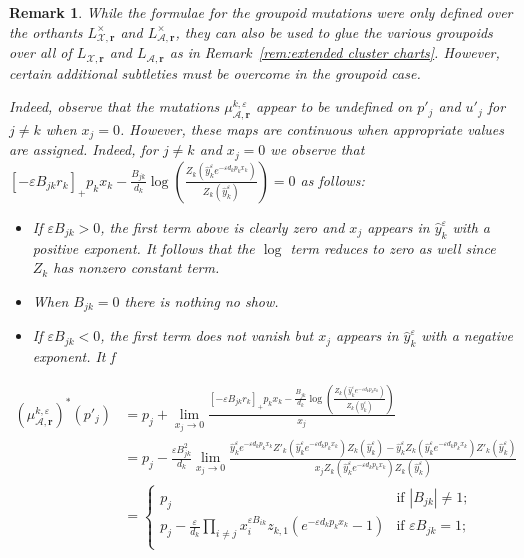 \documentclass{amsart}
\newtheorem{remark}[theorem]{Remark}
\numberwithin{equation}{section}
\newcommand{\bfr}{{\boldsymbol{r}}}
\newcommand{\cA}{\mathcal{A}}
\newcommand{\cX}{\mathcal{X}}
\begin{document}
\begin{remark}
  \label{rem:extended groupoid charts}
  While the formulae for the groupoid mutations were only defined over the orthants $L^\times_{\cX,\bfr}$ and $L^\times_{\cA,\bfr}$, they can also be used to glue the various groupoids over all of $L_{\cX,\bfr}$ and $L_{\cA,\bfr}$ as in Remark~\ref{rem:extended cluster charts}.
  However, certain additional subtleties must be overcome in the groupoid case.
  
  Indeed, observe that the mutations $\mu_{\cA,\bfr}^{k,\varepsilon}$ appear to be undefined on $p'_j$ and $u'_j$ for $j\ne k$ when $x_j=0$.
  However, these maps are continuous when appropriate values are assigned.
  Indeed, for $j\ne k$ and $x_j=0$ we observe that $[-\varepsilon B_{jk} r_k]_+ p_k x_k - \frac{B_{jk}}{d_k}\log\left(\frac{Z_k(\hat y_k^\varepsilon e^{-\varepsilon d_kp_kx_k})}{Z_k(\hat y_k^\varepsilon)}\right)=0$ as follows:
  \begin{itemize}
    \item If $\varepsilon B_{jk}>0$, the first term above is clearly zero and $x_j$ appears in $\hat y_k^\varepsilon$ with a positive exponent.
      It follows that the $\log$ term reduces to zero as well since $Z_k$ has nonzero constant term.
    \item When $B_{jk}=0$ there is nothing no show.
    \item If $\varepsilon B_{jk}<0$, the first term does not vanish but $x_j$ appears in $\hat y_k^\varepsilon$ with a negative exponent.
      It f
  \end{itemize}
  \begin{align*}
    (\mu_{\cA,\bfr}^{k,\varepsilon})^*(p'_j)
    &=p_j+\lim_{x_j \to 0}\frac{[-\varepsilon B_{jk} r_k]_+ p_k x_k - \frac{B_{jk}}{d_k}\log\left(\frac{Z_k(\hat y_k^\varepsilon e^{-\varepsilon d_kp_kx_k})}{Z_k(\hat y_k^\varepsilon)}\right)}{x_j}\\
    &=p_j-\frac{\varepsilon B_{jk}^2}{d_k} \lim_{x_j\to 0} \frac{ \hat y_k^\varepsilon e^{-\varepsilon d_kp_kx_k} Z'_k(\hat y_k^\varepsilon e^{-\varepsilon d_kp_kx_k}) Z_k(\hat y_k^\varepsilon) - \hat y_k^\varepsilon Z_k(\hat y_k^\varepsilon e^{-\varepsilon d_kp_kx_k}) Z'_k(\hat y_k^\varepsilon) }{ x_j Z_k(\hat y_k^\varepsilon e^{-\varepsilon d_kp_kx_k}) Z_k(\hat y_k^\varepsilon) }\\
    &=\begin{cases} 
      p_j & \text{if $|B_{jk}| \ne 1$;}\\ 
      p_j - \frac{\varepsilon}{d_k} \prod_{i\ne j} x_i^{\varepsilon B_{ik}} z_{k,1} (e^{-\varepsilon d_kp_kx_k} - 1) & \text{if $\varepsilon B_{jk} = 1$;}\\ 

\end{cases}
\end{align*}
\end{remark}
\end{document}
